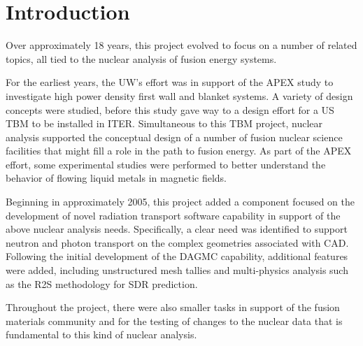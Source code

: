 \chapter{Introduction}

Over approximately 18 years, this project evolved to focus on a number of
related topics, all tied to the nuclear analysis of fusion energy systems.

For the earliest years, the \gls{UW}'s effort was in support of the \gls{APEX}
study to investigate high power density first wall and blanket systems.  A
variety of design concepts were studied, before this study gave way to a
design effort for a US \gls{TBM} to be installed in ITER.  Simultaneous to
this \gls{TBM} project, nuclear analysis supported the conceptual design of a
number of fusion nuclear science facilities that might fill a role in the path
to fusion energy.  As part of the \gls{APEX} effort, some experimental studies
were performed to better understand the behavior of flowing liquid metals in
magnetic fields.

Beginning in approximately 2005, this project added a component focused on the
development of novel radiation transport software capability in support of the
above nuclear analysis needs.  Specifically, a clear need was identified to
support neutron and photon transport on the complex geometries associated with
\gls{CAD}.  Following the initial development of the \gls{DAGMC} capability,
additional features were added, including unstructured mesh tallies and
multi-physics analysis such as the \gls{R2S} methodology for \gls{SDR}
prediction.

Throughout the project, there were also smaller tasks in support of the fusion
materials community and for the testing of changes to the nuclear data that is
fundamental to this kind of nuclear analysis.

